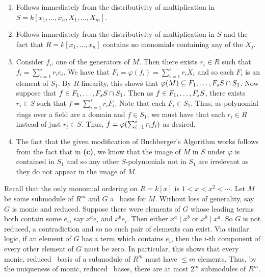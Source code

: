 \documentclass[letterpaper, 11pt, oneside]{book}
\begin{document}
\begin{sol}\label{ex:UAG_5.2.6}
  \begin{enumerate}
    \item Follows immediately from the distributivity of multiplication in $S = k[x_{1}, \ldots, x_{n}, X_{1}, \ldots, X_{m}]$.
    \item Follows immediately from the distributivity of multiplication in $S$ and the fact that $R = k[x_{1}, \ldots, x_{n}]$ contains no monomials containing any of the $X_{j}$.
    \item Consider $f_{i}$, one of the generators of $M$.
          Then there exists $r_{i} \in R$ such that $f_{i} = \sum_{i = 1}^{s} r_{i} e_{i}$.
          We have that $F_{i} = \varphi(f_{i}) = \sum_{i = 1}^{s} r_{i} X_{i}$ and so each $F_{i}$ is an element of $S_{1}$.
          By $R$-linearity, this shows that $\varphi(M) \subseteq \ideal{F_{1}, \ldots, F_{s}}S \cap S_{1}$.
          Now suppose that $f \in \ideal{F_{1}, \ldots, F_{s}}S \cap S_{1}$.
          Then as $f \in \ideal{F_{1}, \ldots, F_{s}}S$, there exists $r_{i} \in S$ such that $f = \sum_{i = 1}^{s} r_{i}F_{i}$.
          Note that each $F_{i} \in S_{1}$.
          Thus, as polynomial rings over a field are a domain and $f \in S_{1}$, we must have that each $r_{i} \in R$ instead of just $r_{i} \in S$.
          Thus, $f = \varphi\pqty{\sum_{i = 1}^{s} r_{i} f_{i}}$ as desired.
    \item The fact that the given modification of Buchberger's Algorithm works follows from the fact that in \textbf{(c)}, we know that the image of $M$ in $S$ under $\varphi$ is contained in $S_{1}$ and so any other $S$-polynomials not in $S_{1}$ are irrelevant as they do not appear in the image of $M$.
  \end{enumerate}
\end{sol}

\begin{sol}\label{ex:UAG_5.2.7}
  Recall that the only monomial ordering on $R = k[x]$ is $1 < x < x^{2} < \cdots$.
  Let $M$ be some submodule of $R^{m}$ and $G$ a \Grobner\ basis for $M$.
  Without loss of generality, say $G$ is monic and reduced.
  Suppose there were elements of $G$ whose leading terms both contain some $e_{i}$, say $x^{a}e_{i}$ and $x^{b}e_{i}$.
  Then either $x^{a} \mid x^{b}$ or $x^{b} \mid x^{a}$.
  So $G$ is not reduced, a contradiction and so no such pair of elements can exist.
  Via similar logic, if an element of $G$ has a term which contains $e_{i}$, then the $i$-th component of every other element of $G$ must be zero.
  In particular, this shows that every monic, reduced \Grobner\ basis of a submodule of $R^{m}$ must have $\leq m$ elements.
  Thus, by the uniqueness of monic, reduced \Grobner\ bases, there are at most $2^{m}$ submodules of $R^{m}$.
\end{sol}
\end{document}
